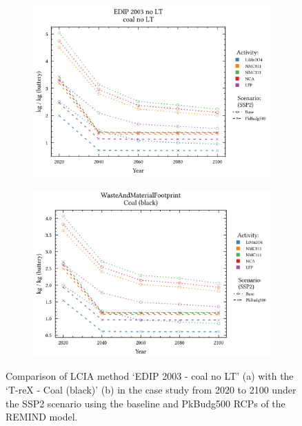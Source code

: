 \begin{figure}[H]
    \centering
    \begin{subfigure}[b]{0.8\linewidth}
        \includegraphics[width=\linewidth]{figures/comparison_methods2.png}
        \caption{}\label{fig:comparison_methods_a}
    \end{subfigure}
    
    \begin{subfigure}[b]{0.8\linewidth}
        \includegraphics[width=\linewidth]{figures/comparison_methods1.png}
        \caption{}\label{fig:comparison_methods_b}
    \end{subfigure}
    \caption{Comparison of LCIA method `EDIP 2003 - coal no LT' (a) with the `T-reX - Coal (black)' (b) in the case study from 2020 to 2100 under the SSP2 scenario using the baseline and PkBudg500 RCPs of the REMIND model.}\label{fig:comparison_methods}
\end{figure}

